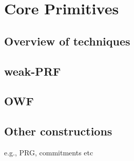 
\section{Core Primitives}

\subsection{Overview of techniques}

\subsection{weak-PRF}

\subsection{OWF}

\subsection{Other constructions}
e.g., PRG, commitments etc
